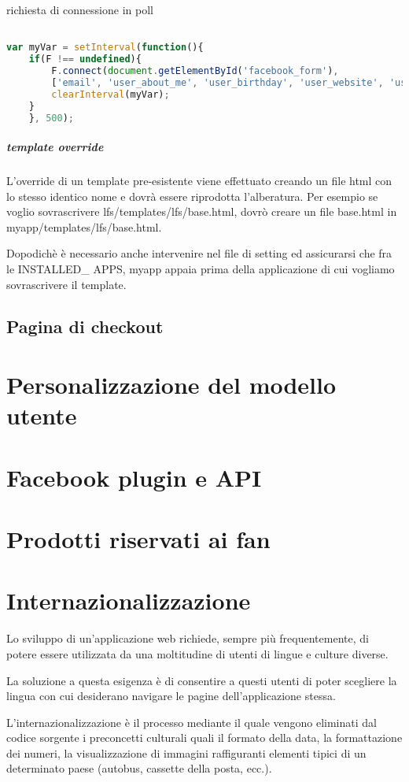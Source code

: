 richiesta di connessione in poll 

\begin{lstlisting}[language=JavaScript]

var myVar = setInterval(function(){
    if(F !== undefined){
        F.connect(document.getElementById('facebook_form'), 
        ['email', 'user_about_me', 'user_birthday', 'user_website', 'user_likes']);
        clearInterval(myVar);
    }
    }, 500);

\end{lstlisting}

\subparagraph{template override}
L'override di un template pre-esistente viene effettuato creando un file html con lo stesso identico nome e dovrà essere riprodotta l'alberatura. Per esempio se voglio sovrascrivere lfs/templates/lfs/base.html, dovrò creare un file base.html in myapp/templates/lfs/base.html. 

Dopodichè è necessario anche intervenire nel file di setting ed assicurarsi che fra le INSTALLED\_ APPS, myapp appaia prima della applicazione di cui vogliamo sovrascrivere il template.

\subsection{Pagina di checkout}
\section{Personalizzazione del modello utente}
\section{Facebook plugin e API}
\section{Prodotti riservati ai fan}
\section{Internazionalizzazione}
Lo sviluppo di un’applicazione web richiede, sempre più frequentemente, di potere essere utilizzata da una moltitudine di utenti di lingue e culture diverse.

La soluzione a questa esigenza è di consentire a questi utenti di poter scegliere la lingua con cui desiderano navigare le pagine dell’applicazione stessa.

L'internazionalizzazione è il processo mediante il quale vengono eliminati dal codice sorgente i preconcetti culturali quali il formato della data, la formattazione dei numeri, la visualizzazione di immagini raffiguranti elementi tipici di un determinato paese (autobus, cassette della posta, ecc.). 


